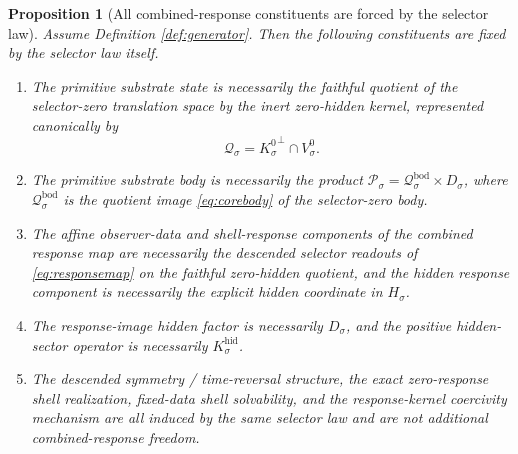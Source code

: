 \documentclass[11pt]{article}
\newcommand{\ProtoBody}[1]{\mathcal P_{#1}}
\newcommand{\GapSpace}[1]{H_{#1}}
\newcommand{\GapBody}[1]{D_{#1}}
\newcommand{\HiddenOperator}[1]{K_{#1}^{\mathrm{hid}}}
\newcommand{\ZeroHiddenVec}[1]{V_{#1}^{0}}
\newcommand{\Kernel}[1]{K_{#1}^{0}}
\newcommand{\CoreState}[1]{\mathcal Q_{#1}}
\newcommand{\CoreBody}[1]{\mathcal Q_{#1}^{\mathrm{bod}}}
\newtheorem{proposition}{Proposition}
\begin{document}
\begin{proposition}[All combined-response constituents are forced by the selector law]
\label{prop:forced}
Assume Definition \ref{def:generator}. Then the following constituents are fixed by the selector law itself.
\begin{enumerate}
    \item The primitive substrate state is necessarily the faithful quotient of the selector-zero translation space by the inert zero-hidden kernel, represented canonically by
    \[
    \CoreState{\sigma}={\Kernel{\sigma}}^{\perp}\cap\ZeroHiddenVec{\sigma}.
    \]
    \item The primitive substrate body is necessarily the product \(\ProtoBody{\sigma}=\CoreBody{\sigma}\times\GapBody{\sigma}\), where \(\CoreBody{\sigma}\) is the quotient image \eqref{eq:corebody} of the selector-zero body.
    \item The affine observer-data and shell-response components of the combined response map are necessarily the descended selector readouts of \eqref{eq:responsemap} on the faithful zero-hidden quotient, and the hidden response component is necessarily the explicit hidden coordinate in \(\GapSpace{\sigma}\).
    \item The response-image hidden factor is necessarily \(\GapBody{\sigma}\), and the positive hidden-sector operator is necessarily \(\HiddenOperator{\sigma}\).
    \item The descended symmetry / time-reversal structure, the exact zero-response shell realization, fixed-data shell solvability, and the response-kernel coercivity mechanism are all induced by the same selector law and are not additional combined-response freedom.
\end{enumerate}
\end{proposition}
\end{document}
